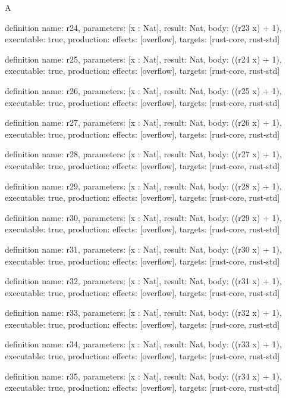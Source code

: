 \begin{lexlean}{A}
\begin{semanticmodule}
definition{
  name: r24,
  parameters: [x : Nat],
  result: Nat,
  body: ((r23 x) + 1),
  executable: true,
  production: {effects: [overflow], targets: [rust-core, rust-std]}
}

definition{
  name: r25,
  parameters: [x : Nat],
  result: Nat,
  body: ((r24 x) + 1),
  executable: true,
  production: {effects: [overflow], targets: [rust-core, rust-std]}
}

definition{
  name: r26,
  parameters: [x : Nat],
  result: Nat,
  body: ((r25 x) + 1),
  executable: true,
  production: {effects: [overflow], targets: [rust-core, rust-std]}
}

definition{
  name: r27,
  parameters: [x : Nat],
  result: Nat,
  body: ((r26 x) + 1),
  executable: true,
  production: {effects: [overflow], targets: [rust-core, rust-std]}
}

definition{
  name: r28,
  parameters: [x : Nat],
  result: Nat,
  body: ((r27 x) + 1),
  executable: true,
  production: {effects: [overflow], targets: [rust-core, rust-std]}
}

definition{
  name: r29,
  parameters: [x : Nat],
  result: Nat,
  body: ((r28 x) + 1),
  executable: true,
  production: {effects: [overflow], targets: [rust-core, rust-std]}
}

definition{
  name: r30,
  parameters: [x : Nat],
  result: Nat,
  body: ((r29 x) + 1),
  executable: true,
  production: {effects: [overflow], targets: [rust-core, rust-std]}
}

definition{
  name: r31,
  parameters: [x : Nat],
  result: Nat,
  body: ((r30 x) + 1),
  executable: true,
  production: {effects: [overflow], targets: [rust-core, rust-std]}
}

definition{
  name: r32,
  parameters: [x : Nat],
  result: Nat,
  body: ((r31 x) + 1),
  executable: true,
  production: {effects: [overflow], targets: [rust-core, rust-std]}
}

definition{
  name: r33,
  parameters: [x : Nat],
  result: Nat,
  body: ((r32 x) + 1),
  executable: true,
  production: {effects: [overflow], targets: [rust-core, rust-std]}
}

definition{
  name: r34,
  parameters: [x : Nat],
  result: Nat,
  body: ((r33 x) + 1),
  executable: true,
  production: {effects: [overflow], targets: [rust-core, rust-std]}
}

definition{
  name: r35,
  parameters: [x : Nat],
  result: Nat,
  body: ((r34 x) + 1),
  executable: true,
  production: {effects: [overflow], targets: [rust-core, rust-std]}
}


\end{semanticmodule}
\end{lexlean}
